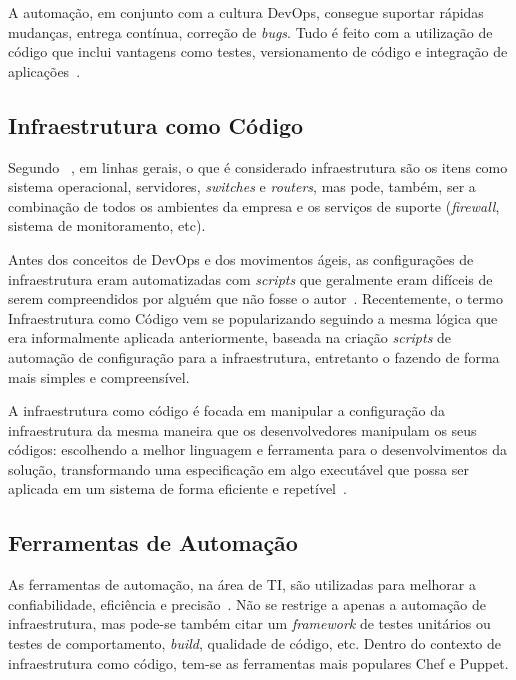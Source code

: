 A automação, em conjunto com a cultura DevOps, consegue suportar rápidas mudanças,
entrega contínua, correção de \textit{bugs}. Tudo é feito com a utilização de
código que inclui vantagens como testes, versionamento de código e
integração de aplicações~\cite{sharma:2015}.

\subsection{Infraestrutura como Código}

Segundo ~, em linhas gerais, o que é considerado
infraestrutura são os itens como sistema operacional, servidores,
\textit{switches} e \textit{routers}, mas pode, também, ser a combinação
de todos os ambientes da empresa e os serviços de suporte (\textit{firewall},
sistema de monitoramento, etc).

Antes dos conceitos de DevOps e dos movimentos ágeis, as configurações de
infraestrutura eram automatizadas com \textit{scripts} que geralmente eram
difíceis de serem compreendidos por alguém que não fosse o autor~\cite{huttermann:2012}.
Recentemente, o termo Infraestrutura como Código vem se popularizando
seguindo a mesma lógica que era informalmente aplicada anteriormente, baseada na criação
\textit{scripts} de automação de configuração para a infraestrutura, entretanto o fazendo
de forma mais simples e compreensível.

A infraestrutura como código é focada em manipular a configuração da infraestrutura
da mesma maneira que os desenvolvedores manipulam os seus códigos: escolhendo a melhor
linguagem e ferramenta para o desenvolvimentos da solução, transformando uma especificação
em algo executável que possa ser aplicada em um sistema de forma eficiente e
repetível~\cite{huttermann:2012}.


\subsection{Ferramentas de Automação}
\label{sec:ferramenta_automacao}

As ferramentas de automação, na área de TI, são utilizadas para melhorar
a confiabilidade, eficiência e precisão~\cite{sharma:2015}. Não se restrige a
apenas a automação de infraestrutura, mas pode-se também citar um \textit{framework}
de testes unitários ou testes de comportamento, \textit{build}, qualidade de código, etc.
Dentro do contexto de infraestrutura como código, tem-se as ferramentas
mais populares Chef e Puppet.

